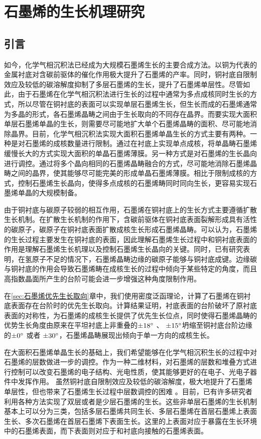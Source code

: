 \def\CCluster#1{\rm{C_{#1}}}
\chapter{石墨烯的生长机理研究}
\section{引言}
如今，化学气相沉积法已经成为大规模石墨烯生长的主要合成方法。以铜为代表的金属衬底对含碳前驱体的催化作用极大提升了石墨烯的产率。同时，铜衬底自限制效应及较低的碳溶解度抑制了多层石墨烯的生长，提升了石墨烯单层性。尽管如此，由于石墨烯在化学气相沉积法进行生长的过程中通常为多点成核同时生长的方式，所以尽管在铜衬底的表面可以实现单层石墨烯生长，但生长而成的石墨烯通常为多晶的形式，各石墨烯晶畴之间由于生长取向的不同存在晶界。而要实现大面积单层石墨烯单晶的生长，则需要尽可能地扩大单个石墨烯晶畴的面积、尽可能地消除晶界。目前，化学气相沉积法实现大面积石墨烯单晶生长的方式主要有两种。一种是对石墨烯的成核数量进行限制。通过在衬底上实现单点成核，将单晶畴石墨烯缓慢长大的方式实现大面积的单晶石墨烯薄膜。另一种方式是对石墨烯的生长晶向进行调控。通过将多个晶向相同的石墨烯晶畴融合的方式，尽可能地消除石墨烯晶畴之间的晶界，使其能够尽可能完美的形成单晶石墨烯薄膜。相比于限制成核的方式，控制石墨烯生长晶向，使得多点成核的石墨烯畴同时同向生长，更容易实现石墨烯单晶的大规模制备。%

由于铜衬底与碳原子较弱的相互作用，石墨烯在铜衬底上的生长方式主要遵循扩散生长机制。在扩散生长机制的作用下，含碳前驱体在铜衬底表面裂解形成具有活性的碳原子，碳原子在铜衬底表面扩散成核生长形成石墨烯晶畴。可以认为，石墨烯的生长过程主要发生在铜衬底的表面，因此理解石墨烯生长过程中和铜衬底表面的作用是理解石墨烯生长机理以及控制石墨烯生长晶向的关键。同时，已有研究表明，在氢原子不足的情况下，石墨烯晶畴边缘的碳原子能够与铜衬底成键。边缘碳与铜衬底的作用会导致石墨烯畴在成核生长的过程中倾向于某些特定的角度，而且高指数晶面所产生的台阶可能会进一步增强这种角度限制作用。%

在\ref{sec:石墨烯优先生长取向}章中，我们使用密度泛函理论，计算了石墨烯在铜衬底表面存在台阶时的优先生长取向。计算结果证明，衬底表面的台阶破坏了原衬底表面的对称性，为石墨烯的成核生长提供了优先生长位点，同时使得石墨烯晶畴的优势生长角度由原来在平坦衬底上非重叠的$\SI{\pm 18}{\degree}$ 、 $\SI{\pm 15}{\degree}$坍缩至铜衬底台阶边缘的$\SI{\pm 0}{\degree}$ 或者 $\SI{\pm 30}{\degree}$，石墨烯晶畴展现出倾向于单一方向的成核生长。


在大面积石墨烯单晶生长的基础上，我们希望能够在化学气相沉积生长的过程中对石墨烯的层数做进一步的调控。作为一种二维材料，对石墨烯的层数和堆叠方式进行控制可以改变石墨烯的电子结构、光电性质，使其能够更好的在电子、光电子器件中发挥作用。
虽然铜衬底自限制效应及较低的碳溶解度，极大地提升了石墨烯单层性，但也带来了石墨烯生长过程中层数调控的困难 。目前，已有许多研究者利用各种方法实现了双层或者是少层石墨烯的生长。这些非单层石墨烯的生长机制基本上可以分为三类，包括多层石墨烯共同生长、多层石墨烯在首层石墨烯上表面生长、多次石墨烯在首层石墨烯下表面生长。这里的上表面对应于暴露在生长环境中的石墨烯表面，而下表面则对应于和衬底向接触的石墨烯表面。%

